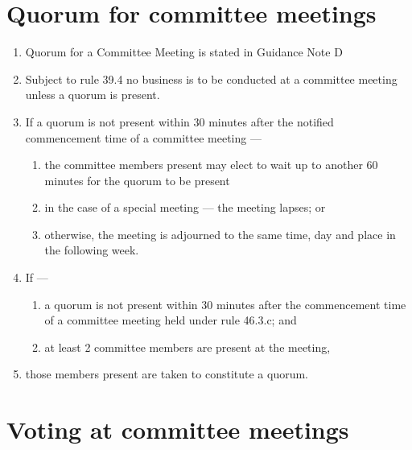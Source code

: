 \hypertarget{quorum-for-committee-meetings}{%
\section{Quorum for committee meetings}\label{quorum-for-committee-meetings}}

\begin{enumerate}

\item Quorum for a Committee Meeting is stated in Guidance Note D
\item Subject to rule 39.4 no business is to be conducted at a committee meeting unless a quorum is present.
\item If a quorum is not present within 30 minutes after the notified commencement time of a committee meeting ---

  \begin{enumerate}
  
  \item the committee members present may elect to wait up to another 60 minutes for the quorum to be present
  \item in the case of a special meeting --- the meeting lapses; or
  \item otherwise, the meeting is adjourned to the same time, day and place in the following week.
  \end{enumerate}
\item If ---

  \begin{enumerate}
  
  \item a quorum is not present within 30 minutes after the commencement time of a committee meeting held under rule 46.3.c; and
  \item at least 2 committee members are present at the meeting,
  \end{enumerate}
\item those members present are taken to constitute a quorum.
\end{enumerate}

\hypertarget{voting-at-committee-meetings}{%
\section{Voting at committee meetings}\label{voting-at-committee-meetings}}

